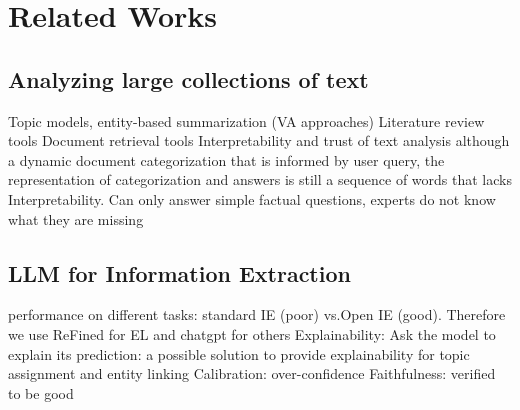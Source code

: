 \section{Related Works}
\subsection{Analyzing large collections of text}
Topic models, entity-based summarization (VA approaches)
Literature review tools
Document retrieval tools 
\cite{chuang2012interpretation, lee2017humantopicmodel} Interpretability and trust of text analysis
\cite{qiu2022docflow} although a dynamic document categorization that is informed by user query, the representation of categorization and answers is still a sequence of words that lacks Interpretability.
Can only answer simple factual questions, experts do not know what they are missing

\subsection{LLM for Information Extraction}
\cite{li2023evaluateChatgpt}
performance on different tasks: standard IE (poor) vs.Open IE (good). Therefore we use ReFined for EL and chatgpt for others
Explainability: Ask the model to explain its prediction: a possible solution to provide explainability for topic assignment and entity linking
Calibration: over-confidence
Faithfulness: verified to be good



